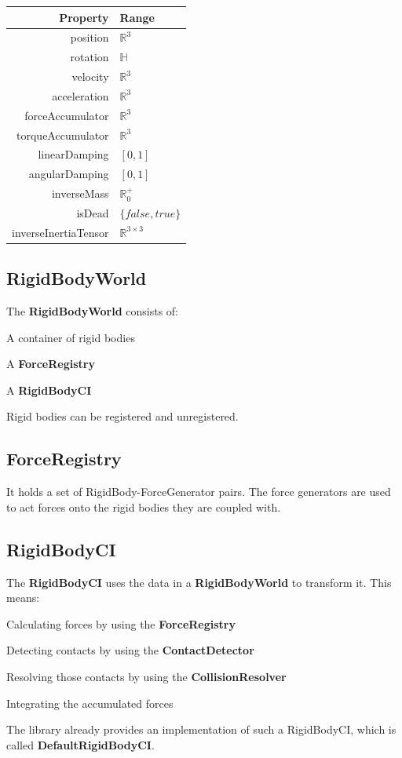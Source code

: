 \documentclass[12p, paper=a4, leqno, colorinlistoftodos]{article}
\newenvironment{packed_itemize}
{\begin{itemize}
		\setlength{\itemsep}{0pt}
		\setlength{\parskip}{0pt}
		\setlength{\parsep}{0pt}
	}{\end{itemize}}
\begin{document}
		\begin{tabular}[H]{r | l}
			Property & Range\\
			\hline
			position & $\mathbb{R}^3$\\
			rotation & $\mathbb{H}$\\
			velocity & $\mathbb{R}^3$\\
			acceleration & $\mathbb{R}^3$\\
			forceAccumulator & $\mathbb{R}^3$\\
			torqueAccumulator & $\mathbb{R}^3$\\
			linearDamping & $[0, 1]$\\
			angularDamping & $[0, 1]$\\
			inverseMass & $\mathbb{R}^+_0$\\
			isDead & $\{false, true\}$\\
			inverseInertiaTensor & $\mathbb{R}^{3 \times 3}$\\
		\end{tabular}
	
		\subsection{RigidBodyWorld}
		The \textbf{RigidBodyWorld} consists of:
		\begin{packed_itemize}
			\item A container of rigid bodies
			\item A \textbf{ForceRegistry}
			\item A \textbf{RigidBodyCI}
		\end{packed_itemize}
		Rigid bodies can be registered and unregistered.
		
		\subsection{ForceRegistry}
		It holds a set of RigidBody-ForceGenerator pairs. The force generators are used to act forces onto the rigid bodies they are coupled with.
		
		\subsection{RigidBodyCI}
		The \textbf{RigidBodyCI} uses the data in a \textbf{RigidBodyWorld} to transform it. This means:
		\begin{packed_itemize}
			\item Calculating forces by using the \textbf{ForceRegistry}
			\item Detecting contacts by using the \textbf{ContactDetector}
			\item Resolving those contacts by using the \textbf{CollisionResolver}
			\item Integrating the accumulated forces
		\end{packed_itemize}
		The library already provides an implementation of such a RigidBodyCI, which is called \textbf{DefaultRigidBodyCI}.
		
\end{document}
